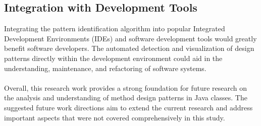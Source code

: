 \documentclass[draft]{article}
\begin{document}
\subsection{Integration with Development Tools}
Integrating the pattern identification algorithm into popular Integrated Development Environments (IDEs) and software development tools would greatly benefit software developers. The automated detection and visualization of design patterns directly within the development environment could aid in the understanding, maintenance, and refactoring of software systems.\\
~\\
Overall, this research work provides a strong foundation for future research on the analysis and understanding of method design patterns in Java classes. The suggested future work directions aim to extend the current research and address important aspects that were not covered comprehensively in this study.\\
~\\

\newpage
\end{document}
